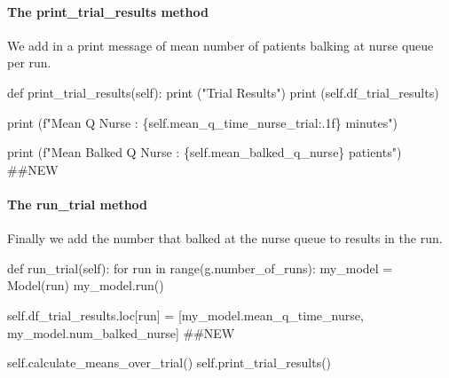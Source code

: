 \documentclass[
  letterpaper,
  DIV=11,
  numbers=noendperiod]{scrreprt}
\let\oldparagraph\paragraph
\renewcommand{\paragraph}[1]{\oldparagraph{#1}\mbox{}}
\newenvironment{Shaded}{\begin{snugshade}}{\end{snugshade}}
\newcommand{\BuiltInTok}[1]{\textcolor[rgb]{0.00,0.23,0.31}{#1}}
\newcommand{\CommentTok}[1]{\textcolor[rgb]{0.37,0.37,0.37}{#1}}
\newcommand{\ControlFlowTok}[1]{\textcolor[rgb]{0.00,0.23,0.31}{#1}}
\newcommand{\KeywordTok}[1]{\textcolor[rgb]{0.00,0.23,0.31}{#1}}
\newcommand{\NormalTok}[1]{\textcolor[rgb]{0.00,0.23,0.31}{#1}}
\newcommand{\OperatorTok}[1]{\textcolor[rgb]{0.37,0.37,0.37}{#1}}
\newcommand{\SpecialCharTok}[1]{\textcolor[rgb]{0.37,0.37,0.37}{#1}}
\newcommand{\SpecialStringTok}[1]{\textcolor[rgb]{0.13,0.47,0.30}{#1}}
\newcommand{\StringTok}[1]{\textcolor[rgb]{0.13,0.47,0.30}{#1}}
\newcommand{\VariableTok}[1]{\textcolor[rgb]{0.07,0.07,0.07}{#1}}
\begin{document}
\paragraph{The print\_trial\_results
method}\label{the-print_trial_results-method-1}

We add in a print message of mean number of patients balking at nurse
queue per run.

\begin{Shaded}
\begin{Highlighting}[]
\KeywordTok{def}\NormalTok{ print\_trial\_results(}\VariableTok{self}\NormalTok{):}
    \BuiltInTok{print}\NormalTok{ (}\StringTok{"Trial Results"}\NormalTok{)}
    \BuiltInTok{print}\NormalTok{ (}\VariableTok{self}\NormalTok{.df\_trial\_results)}

    \BuiltInTok{print}\NormalTok{ (}\SpecialStringTok{f"Mean Q Nurse : }\SpecialCharTok{\{}\VariableTok{self}\SpecialCharTok{.}\NormalTok{mean\_q\_time\_nurse\_trial}\SpecialCharTok{:.1f\}}\SpecialStringTok{ minutes"}\NormalTok{)}

    \BuiltInTok{print}\NormalTok{ (}\SpecialStringTok{f"Mean Balked Q Nurse : }\SpecialCharTok{\{}\VariableTok{self}\SpecialCharTok{.}\NormalTok{mean\_balked\_q\_nurse}\SpecialCharTok{\}}\SpecialStringTok{ patients"}\NormalTok{) }\CommentTok{\#\#NEW}
\end{Highlighting}
\end{Shaded}

\paragraph{The run\_trial method}\label{the-run_trial-method-2}

Finally we add the number that balked at the nurse queue to results in
the run.

\begin{Shaded}
\begin{Highlighting}[]
\KeywordTok{def}\NormalTok{ run\_trial(}\VariableTok{self}\NormalTok{):}
    \ControlFlowTok{for}\NormalTok{ run }\KeywordTok{in} \BuiltInTok{range}\NormalTok{(g.number\_of\_runs):}
\NormalTok{        my\_model }\OperatorTok{=}\NormalTok{ Model(run)}
\NormalTok{        my\_model.run()}

        \VariableTok{self}\NormalTok{.df\_trial\_results.loc[run] }\OperatorTok{=}\NormalTok{ [my\_model.mean\_q\_time\_nurse,}
\NormalTok{                                            my\_model.num\_balked\_nurse] }\CommentTok{\#\#NEW}

    \VariableTok{self}\NormalTok{.calculate\_means\_over\_trial()}
    \VariableTok{self}\NormalTok{.print\_trial\_results()}
\end{Highlighting}
\end{Shaded}
\end{document}
